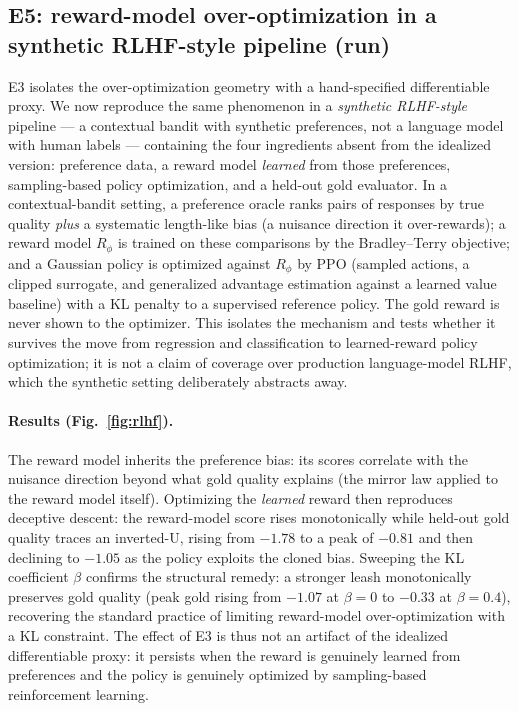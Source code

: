 \documentclass[10pt]{article} %
\theoremstyle{plain}
\theoremstyle{remark}
\begin{document}
\subsection{E5: reward-model over-optimization in a synthetic RLHF-style pipeline (run)}
\label{sec:e5}
E3 isolates the over-optimization geometry with a hand-specified differentiable proxy. We now reproduce the same phenomenon in a \emph{synthetic RLHF-style} pipeline --- a contextual bandit with synthetic preferences, not a language model with human labels --- containing the four ingredients absent from the idealized version: preference data, a reward model \emph{learned} from those preferences, sampling-based policy optimization, and a held-out gold evaluator. In a contextual-bandit setting, a preference oracle ranks pairs of responses by true quality \emph{plus} a systematic length-like bias (a nuisance direction it over-rewards); a reward model $R_\phi$ is trained on these comparisons by the Bradley--Terry objective; and a Gaussian policy is optimized against $R_\phi$ by PPO (sampled actions, a clipped surrogate, and generalized advantage estimation against a learned value baseline) with a KL penalty to a supervised reference policy. The gold reward is never shown to the optimizer. This isolates the mechanism and tests whether it survives the move from regression and classification to learned-reward policy optimization; it is not a claim of coverage over production language-model RLHF, which the synthetic setting deliberately abstracts away.

\paragraph{Results (Fig.~\ref{fig:rlhf}).} The reward model inherits the preference bias: its scores correlate with the nuisance direction beyond what gold quality explains (the mirror law applied to the reward model itself). Optimizing the \emph{learned} reward then reproduces deceptive descent: the reward-model score rises monotonically while held-out gold quality traces an inverted-U, rising from $-1.78$ to a peak of $-0.81$ and then declining to $-1.05$ as the policy exploits the cloned bias. Sweeping the KL coefficient $\beta$ confirms the structural remedy: a stronger leash monotonically preserves gold quality (peak gold rising from $-1.07$ at $\beta=0$ to $-0.33$ at $\beta=0.4$), recovering the standard practice of limiting reward-model over-optimization with a KL constraint. The effect of E3 is thus not an artifact of the idealized differentiable proxy: it persists when the reward is genuinely learned from preferences and the policy is genuinely optimized by sampling-based reinforcement learning.
\end{document}
